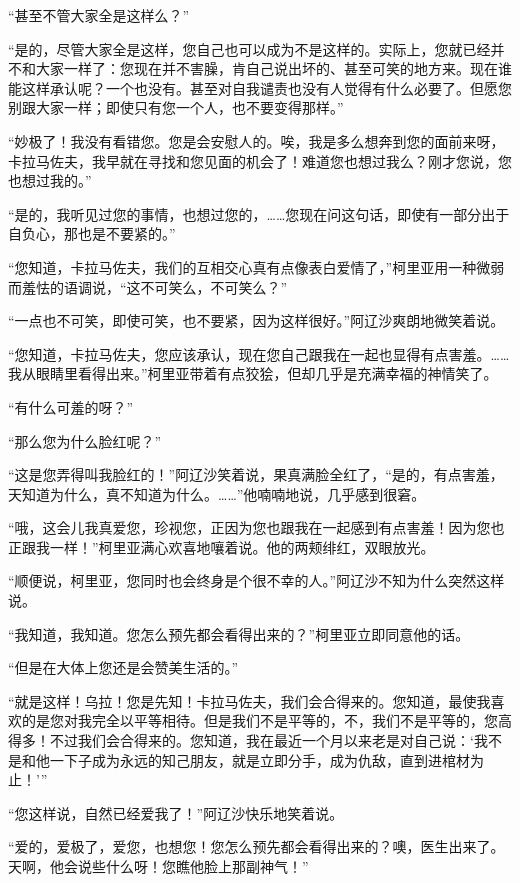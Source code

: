 \par “甚至不管大家全是这样么？”
\par “是的，尽管大家全是这样，您自己也可以成为不是这样的。实际上，您就已经并不和大家一样了：您现在并不害臊，肯自己说出坏的、甚至可笑的地方来。现在谁能这样承认呢？一个也没有。甚至对自我谴责也没有人觉得有什么必要了。但愿您别跟大家一样；即使只有您一个人，也不要变得那样。”
\par “妙极了！我没有看错您。您是会安慰人的。唉，我是多么想奔到您的面前来呀，卡拉马佐夫，我早就在寻找和您见面的机会了！难道您也想过我么？刚才您说，您也想过我的。”
\par “是的，我听见过您的事情，也想过您的，……您现在问这句话，即使有一部分出于自负心，那也是不要紧的。”
\par “您知道，卡拉马佐夫，我们的互相交心真有点像表白爱情了，”柯里亚用一种微弱而羞怯的语调说，“这不可笑么，不可笑么？”
\par “一点也不可笑，即使可笑，也不要紧，因为这样很好。”阿辽沙爽朗地微笑着说。
\par “您知道，卡拉马佐夫，您应该承认，现在您自己跟我在一起也显得有点害羞。……我从眼睛里看得出来。”柯里亚带着有点狡狯，但却几乎是充满幸福的神情笑了。
\par “有什么可羞的呀？”
\par “那么您为什么脸红呢？”
\par “这是您弄得叫我脸红的！”阿辽沙笑着说，果真满脸全红了，“是的，有点害羞，天知道为什么，真不知道为什么。……”他喃喃地说，几乎感到很窘。
\par “哦，这会儿我真爱您，珍视您，正因为您也跟我在一起感到有点害羞！因为您也正跟我一样！”柯里亚满心欢喜地嚷着说。他的两颊绯红，双眼放光。
\par “顺便说，柯里亚，您同时也会终身是个很不幸的人。”阿辽沙不知为什么突然这样说。
\par “我知道，我知道。您怎么预先都会看得出来的？”柯里亚立即同意他的话。
\par “但是在大体上您还是会赞美生活的。”
\par “就是这样！乌拉！您是先知！卡拉马佐夫，我们会合得来的。您知道，最使我喜欢的是您对我完全以平等相待。但是我们不是平等的，不，我们不是平等的，您高得多！不过我们会合得来的。您知道，我在最近一个月以来老是对自己说：‘我不是和他一下子成为永远的知己朋友，就是立即分手，成为仇敌，直到进棺材为止！’”
\par “您这样说，自然已经爱我了！”阿辽沙快乐地笑着说。
\par “爱的，爱极了，爱您，也想您！您怎么预先都会看得出来的？噢，医生出来了。天啊，他会说些什么呀！您瞧他脸上那副神气！”
